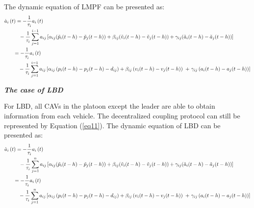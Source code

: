 \documentclass[a4paper]{cas-sc}
\begin{document}
The dynamic equation of LMPF can be presented as:
\begin{equation}
  \begin{gathered}
    {{\dot a}_i}\left( t \right) =  - \frac{1}{{{\tau _i}}}{a_i}\left( t \right) \hfill \\
    \;\;\;{\kern 1pt} \;\;\;{\kern 1pt} \;\;\;{\kern 1pt}  - \frac{1}{{{\tau _i}}}\sum\limits_{j = 1}^{i - 1} {{a_{ij}}\left[ {{\alpha _{ij}}({{\tilde p}_i}(t - h) - {{\tilde p}_j}(t - h)) + {\beta _{ij}}({{\tilde v}_i}(t - h) - {{\tilde v}_j}(t - h)) + {\gamma _{ij}}({{\tilde a}_i}(t - h) - {{\tilde a}_j}(t - h))} \right]}  \hfill \\
    \quad \quad  =  - \frac{1}{{{\tau _i}}}{a_i}\left( t \right) \hfill \\
    \;\;\;{\kern 1pt} \;\;\;{\kern 1pt} \;\;\; - \frac{1}{{{\tau _i}}}\sum\limits_{j = 1}^{i - 1} {{a_{ij}}\left[ {{\alpha _{ij}}\left( {{p_i}(t - h) - {p_j}(t - h) - {d_{ij}}} \right) + {\beta _{ij}}\left( {{v_i}(t - h) - {v_j}(t - h)} \right){\text{ + }}{\gamma _{ij}}\left( {{a_i}(t - h) - {a_j}(t - h)} \right)} \right]}  \hfill \\
  \end{gathered}
  \label{eq56}
\end{equation}

\textbf{\emph{The case of LBD}}

For LBD, all CAVs in the platoon except the leader are able to obtain information from each vehicle. The decentralized coupling protocol can still be represented by Equation (\ref{eq11}). The dynamic equation of LBD can be presented as:
\begin{equation}
  \begin{gathered}
    {{\dot a}_i}\left( t \right) =  - \frac{1}{{{\tau _i}}}{a_i}\left( t \right) \hfill \\
    \;\;\;{\kern 1pt} \;\;\;{\kern 1pt} \;\;\;{\kern 1pt}  - \frac{1}{{{\tau _i}}}\sum\limits_{j = 1}^n {{a_{ij}}\left[ {{\alpha _{ij}}({{\tilde p}_i}(t - h) - {{\tilde p}_j}(t - h)) + {\beta _{ij}}({{\tilde v}_i}(t - h) - {{\tilde v}_j}(t - h)) + {\gamma _{ij}}({{\tilde a}_i}(t - h) - {{\tilde a}_j}(t - h))} \right]}  \hfill \\
    \quad \quad  =  - \frac{1}{{{\tau _i}}}{a_i}\left( t \right) \hfill \\
    \;\;\;{\kern 1pt} \;\;\;{\kern 1pt} \;\;\; - \frac{1}{{{\tau _i}}}\sum\limits_{j = 1}^n {{a_{ij}}\left[ {{\alpha _{ij}}\left( {{p_i}(t - h) - {p_j}(t - h) - {d_{ij}}} \right) + {\beta _{ij}}\left( {{v_i}(t - h) - {v_j}(t - h)} \right){\text{ + }}{\gamma _{ij}}\left( {{a_i}(t - h) - {a_j}(t - h)} \right)} \right]}  \hfill \\
  \end{gathered}
  \label{eq57}
\end{equation}
\end{document}
